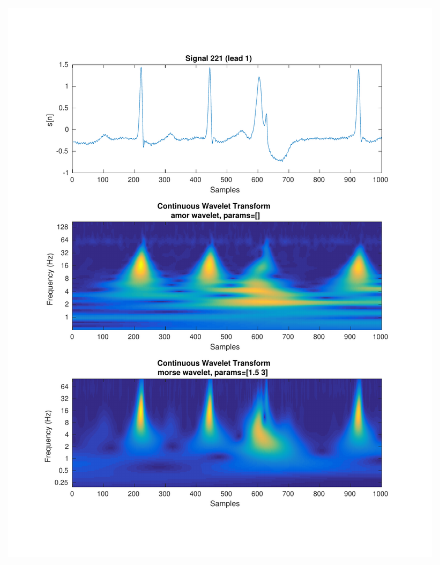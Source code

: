 \documentclass{beamer}
\begin{document}
\begin{frame}
\begin{columns}
\begin{figure}
\includegraphics[width=\textwidth]{fig/221l1_cwt.pdf}
\end{figure}
\end{columns}
\end{frame}
\end{document}
